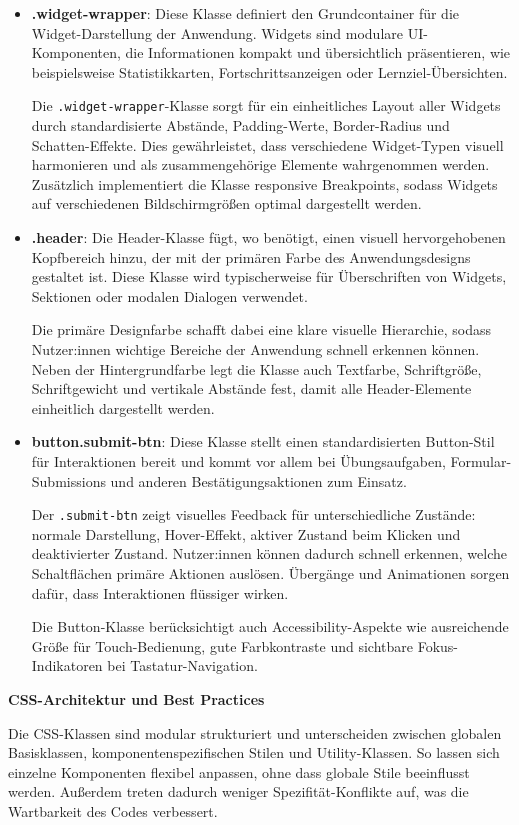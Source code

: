 \begin{itemize}
    \item \textbf{.widget-wrapper}: 
    Diese Klasse definiert den Grundcontainer für die Widget-Darstellung der Anwendung. Widgets sind modulare UI-Komponenten, die Informationen kompakt und übersichtlich präsentieren, wie beispielsweise Statistikkarten, Fortschrittsanzeigen oder Lernziel-Übersichten. 
    
    Die \texttt{.widget-wrapper}-Klasse sorgt für ein einheitliches Layout aller Widgets durch standardisierte Abstände, Padding-Werte, Border-Radius und Schatten-Effekte. Dies gewährleistet, dass verschiedene Widget-Typen visuell harmonieren und als zusammengehörige Elemente wahrgenommen werden. Zusätzlich implementiert die Klasse responsive Breakpoints, sodass Widgets auf verschiedenen Bildschirmgrößen optimal dargestellt werden.
    
    \item \textbf{.header}:
    Die Header-Klasse fügt, wo benötigt, einen visuell hervorgehobenen Kopfbereich hinzu, der mit der primären Farbe des Anwendungsdesigns gestaltet ist. Diese Klasse wird typischerweise für Überschriften von Widgets, Sektionen oder modalen Dialogen verwendet.
    
    Die primäre Designfarbe schafft dabei eine klare visuelle Hierarchie, sodass Nutzer:innen wichtige Bereiche der Anwendung schnell erkennen können. Neben der Hintergrundfarbe legt die Klasse auch Textfarbe, Schriftgröße, Schriftgewicht und vertikale Abstände fest, damit alle Header-Elemente einheitlich dargestellt werden.
    
    \item \textbf{button.submit-btn}:
    Diese Klasse stellt einen standardisierten Button-Stil für Interaktionen bereit und kommt vor allem bei Übungsaufgaben, Formular-Submissions und anderen Bestätigungsaktionen zum Einsatz. 
    
    Der \texttt{.submit-btn} zeigt visuelles Feedback für unterschiedliche Zustände: normale Darstellung, Hover-Effekt, aktiver Zustand beim Klicken und deaktivierter Zustand. Nutzer:innen können dadurch schnell erkennen, welche Schaltflächen primäre Aktionen auslösen. Übergänge und Animationen sorgen dafür, dass Interaktionen flüssiger wirken.
    
    Die Button-Klasse berücksichtigt auch Accessibility-Aspekte wie ausreichende Größe für Touch-Bedienung, gute Farbkontraste und sichtbare Fokus-Indikatoren bei Tastatur-Navigation.
\end{itemize}

\textbf{CSS-Architektur und Best Practices}

Die CSS-Klassen sind modular strukturiert und unterscheiden zwischen globalen Basisklassen, komponentenspezifischen Stilen und Utility-Klassen. So lassen sich einzelne Komponenten flexibel anpassen, ohne dass globale Stile beeinflusst werden. Außerdem treten dadurch weniger Spezifität-Konflikte auf, was die Wartbarkeit des Codes verbessert.

